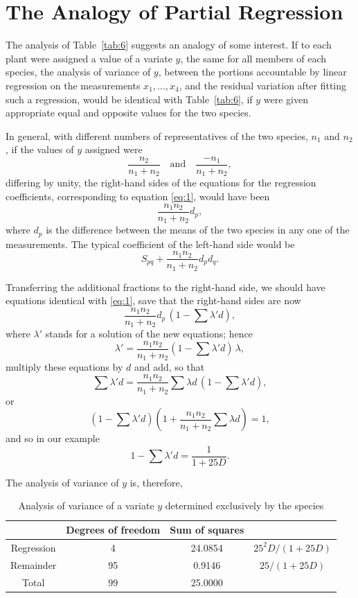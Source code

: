 \documentclass[12pt]{article}
\begin{document}
\section{The Analogy of Partial Regression}

The analysis of Table~\ref{tab:6} suggests an analogy of some interest. If to each plant were
assigned a value of a variate $y$, the same for all members of each species, the analysis of
variance of $y$, between the portions accountable by linear regression on the measurements
$x_{1}, \ldots, x_{4}$, and the residual variation after fitting such a regression, would be identical
with Table~\ref{tab:6}, if $y$ were given appropriate equal and opposite values for the two species.

In general, with different numbers of representatives of the two species, $n_{1}$ and $n_{2}$, if
the values of $y$ assigned were
\[
\frac{n_{2}}{n_{1}+n_{2}} \quad \text{and} \quad \frac{- n_{1}}{n_{1}+n_{2}},
\]
differing by unity, the right-hand sides of the equations for the regression coefficients,
corresponding to equation \eqref{eq:1}, would have been
\[
\frac{n_{1}n_{2}}{n_{1}+n_{2}} d_{p},
\]
where $d_{p}$ is the difference between the means of the two species in any one of the measurements. The typical coefficient of the left-hand side would be
\[
S_{pq} + \frac{n_{1}n_{2}}{n_{1}+n_{2}} d_{p} d_{q}.
\]

Transferring the additional fractions to the right-hand side, we should have equations
identical with \eqref{eq:1}, save that the right-hand sides are now
\[
\frac{n_{1}n_{2}}{n_{1}+n_{2}} d_{p} \, (1 - \sum \lambda' d),
\]
where $\lambda'$ stands for a solution of the new equations; hence
\[
\lambda' = \frac{n_{1}n_{2}}{n_{1}+n_{2}} (1 - \sum \lambda' d) \, \lambda,
\]
multiply these equations by $d$ and add, so that
\[
\sum \lambda' d = \frac{n_{1}n_{2}}{n_{1}+n_{2}} \sum \lambda d \, (1 - \sum \lambda' d),
\]
or
\[
(1 - \sum \lambda' d) \left( 1 + \frac{n_{1}n_{2}}{n_{1}+n_{2}} \sum \lambda d \right) = 1,
\]
and so in our example
\[
1 - \sum \lambda' d = \frac{1}{1+25D}.
\]

The analysis of variance of $y$ is, therefore,

\begin{table}[H]
\centering
\footnotesize
\caption{Analysis of variance of a variate $y$ determined exclusively by the species}
\label{tab:7}
\begin{tabular}{|c|c|c|c|}
\hline
 & Degrees of freedom & Sum of squares & \\
\hline
Regression & 4  & 24.0854 &  $ 25^2D/(1+25D)$ \\
Remainder  & 95 & 0.9146  &  $ 25/(1+25D)$ \\
\hline
Total      & 99 & 25.0000 & \\
\hline
\end{tabular}
\end{table}
\end{document}
